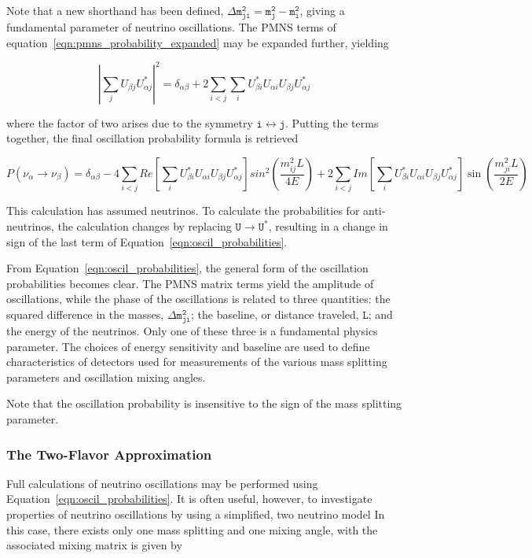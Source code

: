 Note that a new shorthand has been defined, $\mathtt{\Delta m^2_{ji} = m^2_j - m^2_i}$, giving a fundamental parameter of neutrino oscillations.
The PMNS terms of equation~\ref{eqn:pmns_probability_expanded} may be expanded further, yielding 

\begin{equation}
\left| \sum_j U_{\beta j} U^*_{\alpha j}\right|^2 = \delta_{\alpha \beta} + 2 \sum_{i<j} \sum_i U^*_{\beta i} U_{\alpha i}  U_{\beta j} U^*_{\alpha j}
\end{equation}

where the factor of two arises due to the symmetry $\mathtt{i \leftrightarrow j}$.
Putting the terms together, the final oscillation probability formula is retrieved

\begin{equation}
P\left(\nu_\alpha\rightarrow\nu_\beta\right) = \delta_{\alpha \beta} 
	- 4 \sum_{i<j} Re\left[ \sum_i U^*_{\beta i} U_{\alpha i}  U_{\beta j} U^*_{\alpha j} \right] sin^2\left(\frac{m_{ij}^2 L}{4E}\right)
	+ 2 \sum_{i<j} Im\left[ \sum_i U^*_{\beta i} U_{\alpha i}  U_{\beta j} U^*_{\alpha j} \right] \sin\left(\frac{m_{ji}^2 L}{2E}\right)
\label{eqn:oscil_probabilities}
\end{equation}

This calculation has assumed neutrinos.
To calculate the probabilities for anti-neutrinos, the calculation changes by replacing $\mathtt{U \rightarrow U^*}$, resulting in a change in sign of the last term of Equation~\ref{eqn:oscil_probabilities}.

From Equation~\ref{eqn:oscil_probabilities}, the general form of the oscillation probabilities becomes clear. 
The PMNS matrix terms yield the amplitude of oscillations, while the phase of the oscillations is related to three quantities: the squared difference in the masses, $\mathtt{\Delta m^2_{ji}}$; the baseline, or distance traveled, $\mathtt{L}$; and the energy of the neutrinos.
Only one of these three is a fundamental physics parameter.
The choices of energy sensitivity and baseline are used to define characteristics of detectors  used for measurements of the various mass splitting parameters and oscillation mixing angles.

Note that the oscillation probability is insensitive to the sign of the mass splitting parameter.


\label{subsubsec:two_flavors}
\subsubsection{The Two-Flavor Approximation}
Full calculations of neutrino oscillations may be performed using Equation~\ref{eqn:oscil_probabilities}.
It is often useful, however, to investigate properties of neutrino oscillations by using a simplified, two neutrino model
In this case, there exists only one mass splitting and one mixing angle, with the associated mixing matrix is given by

